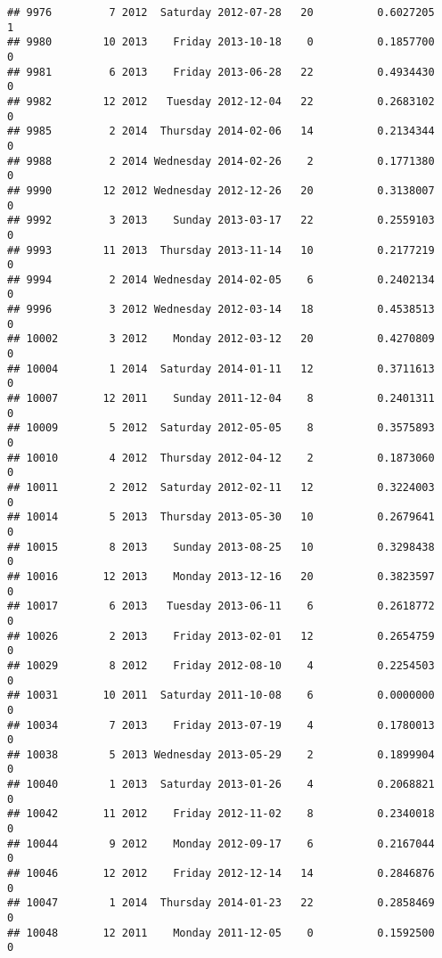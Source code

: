 \documentclass[
]{article}
\begin{document}
\begin{verbatim}
## 9976         7 2012  Saturday 2012-07-28   20          0.6027205             1
## 9980        10 2013    Friday 2013-10-18    0          0.1857700             0
## 9981         6 2013    Friday 2013-06-28   22          0.4934430             0
## 9982        12 2012   Tuesday 2012-12-04   22          0.2683102             0
## 9985         2 2014  Thursday 2014-02-06   14          0.2134344             0
## 9988         2 2014 Wednesday 2014-02-26    2          0.1771380             0
## 9990        12 2012 Wednesday 2012-12-26   20          0.3138007             0
## 9992         3 2013    Sunday 2013-03-17   22          0.2559103             0
## 9993        11 2013  Thursday 2013-11-14   10          0.2177219             0
## 9994         2 2014 Wednesday 2014-02-05    6          0.2402134             0
## 9996         3 2012 Wednesday 2012-03-14   18          0.4538513             0
## 10002        3 2012    Monday 2012-03-12   20          0.4270809             0
## 10004        1 2014  Saturday 2014-01-11   12          0.3711613             0
## 10007       12 2011    Sunday 2011-12-04    8          0.2401311             0
## 10009        5 2012  Saturday 2012-05-05    8          0.3575893             0
## 10010        4 2012  Thursday 2012-04-12    2          0.1873060             0
## 10011        2 2012  Saturday 2012-02-11   12          0.3224003             0
## 10014        5 2013  Thursday 2013-05-30   10          0.2679641             0
## 10015        8 2013    Sunday 2013-08-25   10          0.3298438             0
## 10016       12 2013    Monday 2013-12-16   20          0.3823597             0
## 10017        6 2013   Tuesday 2013-06-11    6          0.2618772             0
## 10026        2 2013    Friday 2013-02-01   12          0.2654759             0
## 10029        8 2012    Friday 2012-08-10    4          0.2254503             0
## 10031       10 2011  Saturday 2011-10-08    6          0.0000000             0
## 10034        7 2013    Friday 2013-07-19    4          0.1780013             0
## 10038        5 2013 Wednesday 2013-05-29    2          0.1899904             0
## 10040        1 2013  Saturday 2013-01-26    4          0.2068821             0
## 10042       11 2012    Friday 2012-11-02    8          0.2340018             0
## 10044        9 2012    Monday 2012-09-17    6          0.2167044             0
## 10046       12 2012    Friday 2012-12-14   14          0.2846876             0
## 10047        1 2014  Thursday 2014-01-23   22          0.2858469             0
## 10048       12 2011    Monday 2011-12-05    0          0.1592500             0

\end{verbatim}
\end{document}
